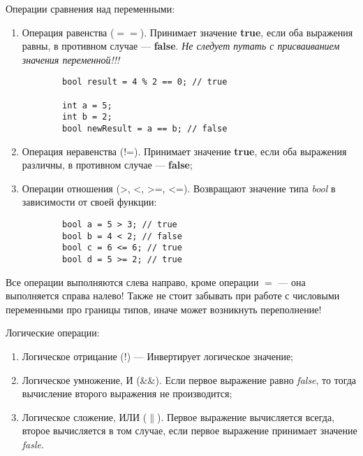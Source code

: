 Операции сравнения над переменными:
\begin{enumerate}
    \item Операция равенства ($==$). Принимает значение \textbf{true}, если оба выражения равны, в противном случае --- \textbf{false}. \textit{Не следует путать с присваиванием значения переменной!!!}

    \begin{lstlisting}
        bool result = 4 % 2 == 0; // true

        int a = 5;
        int b = 2;
        bool newResult = a == b; // false
    \end{lstlisting}

    \item Операция неравенства (!=). Принимает значение \textbf{true}, если оба выражения различны, в противном случае --- \textbf{false};
    \item Операции отношения (>, <, >=, <=). Возвращают значение типа \textit{bool} в зависимости от своей функции:

    \begin{lstlisting}
        bool a = 5 > 3; // true
        bool b = 4 < 2; // false
        bool c = 6 <= 6; // true
        bool d = 5 >= 2; // true
    \end{lstlisting}
\end{enumerate}

Все операции выполняются слева направо, кроме операции $=$ --- она выполняется справа налево! Также не стоит забывать при работе с числовыми переменными про границы типов, иначе может возникнуть переполнение!

Логические операции:

\begin{enumerate}
    \item Логическое отрицание (!) --- Инвертирует логическое значение;
    \item Логическое умножение, И (\&\&). Если первое выражение равно \textit{false}, то тогда вычисление второго выражения не производится;
    \item Логическое сложение, ИЛИ ($\parallel$). Первое выражение вычисляется всегда, второе вычисляется в том случае, если первое выражение принимает значение \textit{fasle}.
\end{enumerate}
